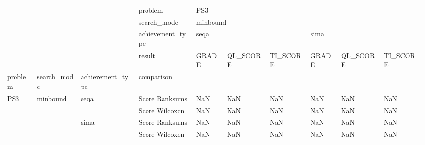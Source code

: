 \begin{tabular}{llllllllll}
\toprule
    &          &      & problem & \multicolumn{6}{l}{PS3} \\
    &          &      & search\_mode & \multicolumn{6}{l}{minbound} \\
    &          &      & achievement\_type & \multicolumn{3}{l}{seqa} & \multicolumn{3}{l}{sima} \\
    &          &      & result &    GRADE & QL\_SCORE & TI\_SCORE & GRADE & QL\_SCORE & TI\_SCORE \\
problem & search\_mode & achievement\_type & comparison &          &          &          &       &          &          \\
\midrule
PS3 & minbound & seqa & Score Ranksums &      NaN &      NaN &      NaN &   NaN &      NaN &      NaN \\
    &          &      & Score Wilcoxon &      NaN &      NaN &      NaN &   NaN &      NaN &      NaN \\
    &          & sima & Score Ranksums &      NaN &      NaN &      NaN &   NaN &      NaN &      NaN \\
    &          &      & Score Wilcoxon &      NaN &      NaN &      NaN &   NaN &      NaN &      NaN \\
\bottomrule
\end{tabular}
